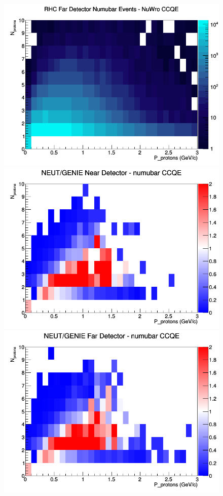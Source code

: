 \begin{figure}[h]
\endminipage
{}
\includegraphics[width=\linewidth]{N_P/nominal/protons/CCQE_RHC_FD_numubar_N_P_NuWro.png}
\endminipage
\newline
{}
\includegraphics[width=\linewidth]{N_P/nominal/protons/ratios/CCQE_NEUT_GENIE_numubar_near_N_P.png}
\endminipage
{}
\includegraphics[width=\linewidth]{N_P/nominal/protons/ratios/CCQE_NEUT_GENIE_numubar_far_N_P.png}

\end{figure}

